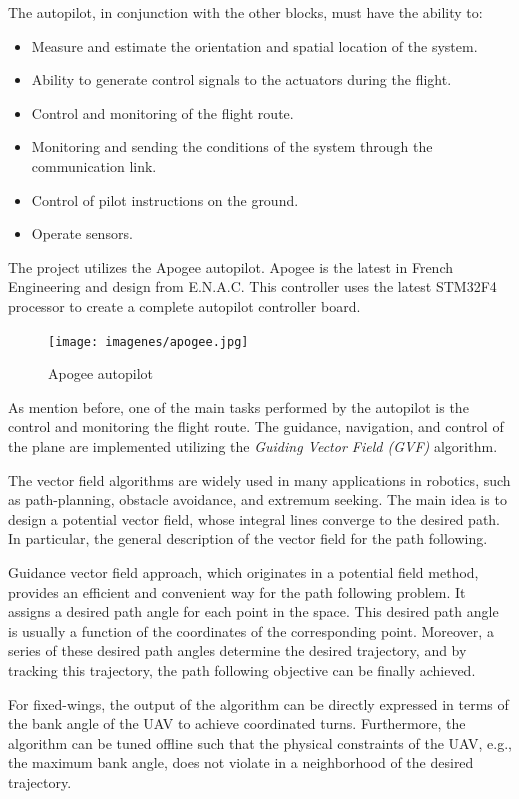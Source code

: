 The autopilot, in conjunction with the other blocks, must have the ability to:
\begin{itemize}
    \item Measure and estimate the orientation and spatial location of the system.
    \item Ability to generate control signals to the actuators during the flight.
    \item Control and monitoring of the flight route.
    \item Monitoring and sending the conditions of the system through the communication link.
    \item Control of pilot instructions on the ground.
    \item Operate sensors.
\end{itemize}

The project utilizes the Apogee autopilot. Apogee is the latest in French Engineering and design from E.N.A.C.  This controller uses the latest STM32F4 processor to create a complete autopilot controller board. \cite{apogee}
\begin{figure}[H]
\centering
\texttt{[image: imagenes/apogee.jpg]}
\caption{Apogee autopilot}
\label{fig:apogee}
\end{figure}
As mention before, one of the main tasks performed by the autopilot is the control and monitoring the flight route. The guidance, navigation, and control of the plane are implemented utilizing the \textit{Guiding Vector Field (GVF)} algorithm. 

The vector field algorithms are widely used in many applications in robotics, such as path-planning, obstacle avoidance, and extremum seeking. The main idea is to design a potential vector field, whose integral lines converge to the desired path. In particular, the general description of the vector field for the path following.\cite{GVF}

Guidance vector field approach, which originates in a potential field method, provides an efficient and convenient way for the path following problem. It assigns a desired path angle for each point in the space. This desired path angle is usually a function of the coordinates of the corresponding point. Moreover, a series of these desired path angles determine the desired trajectory, and by tracking this trajectory, the path following objective can be finally achieved.\cite{7170894}

For fixed-wings, the output of the algorithm can be directly expressed in terms of the bank angle of the UAV to achieve coordinated turns. Furthermore, the algorithm can be tuned offline such that the physical constraints of the UAV, e.g., the maximum bank angle, does not violate in a neighborhood of the desired trajectory.\cite{7942030}

